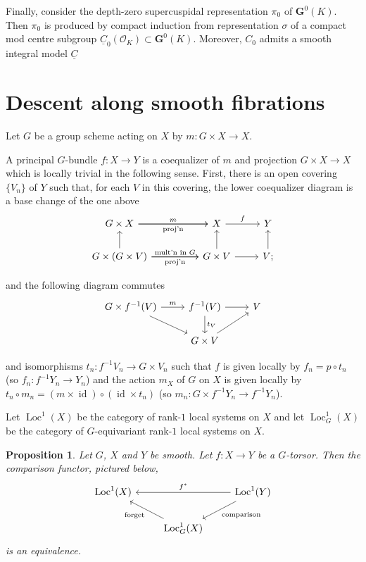 \documentclass[10pt]{amsart}
\theoremstyle{plain}
\newtheorem{proposition}[theorem]{Proposition}
\theoremstyle{definition}
\newcommand{\OK}{\mathcal{O}_K}
\newcommand{\G}{\textbf{G}}
\DeclareMathOperator{\id}{id}
\DeclareMathOperator{\Loc}{Loc}
\begin{document}
Finally, consider the depth-zero supercuspidal representation $\pi_0$ of $\G^0(K)$.
Then $\pi_0$ is produced by compact induction from representation $\sigma$ of a compact mod centre subgroup $\underline{C}_0(\OK) \subset \G^0(K)$. Moreover, $C_0$ admits a smooth integral model $\underline{C}$ 

\appendix

\section{Descent along smooth fibrations}

Let $G$ be a group scheme acting on $X$ by $m : G \times X \to X$.

A principal $G$-bundle $f : X\to Y$ is a coequalizer of $m$ and projection $G\times X \to X$  
which is locally trivial in the following sense.
First, there is an open covering $\{ V_n\}$ of $Y$ such that, for each $V$ in this covering, the lower coequalizer diagram is a base change of the one above
\[
\begin{tikzcd}
G\times X
 \arrow{rr}[shift left]{m}
  \arrow{rr}[shift right,swap]{\text{proj'n}}
&& X \arrow{r}{f} &  Y\\
G\times  (G\times V) \arrow{u}
 \arrow{rr}[shift left]{\text{mult'n in $G$}}
  \arrow{rr}[shift right,swap]{\text{proj'n}}
&& G\times V \arrow{u}  \arrow{r} &  \arrow{u} V;
\end{tikzcd}
\]

and the following diagram commutes
\[
\begin{tikzcd}
G\times  f^{-1}(V)
 \arrow{r}[shift left]{m}
  \arrow{dr} 
& f^{-1}(V) \arrow{r} \arrow{d}{t_V} &  V \\
& G\times V \arrow{ur} & 
\end{tikzcd}
\]


and isomorphisms ${t}_n : f^{-1}{V}_n \to {G}\times {V}_n$ such that  ${f}$ is given locally by ${f}_n = p \circ {t}_n$ (so ${f}_n : {f}^{-1}{Y}_n \to {Y}_n$) and the action ${m}_{X}$ of ${G}$ on ${X}$ is given locally by ${t}_n \circ {m}_n =  ({m} \times \id) \circ (\id\times{t}_n)$ (so ${m}_n : {G}\times{f}^{-1}{Y}_n \to {f}^{-1}{Y}_n$). 

Let $\Loc^1(X)$ be the category of rank-$1$ local systems on $X$ and let $\Loc_G^1(X)$ be the category of $G$-equivariant rank-$1$ local systems on $X$.

\begin{proposition}
Let $G$, $X$ and $Y$ be smooth.
Let $f : X \to Y$ be a $G$-torsor.
Then the comparison functor, pictured below,
\[
\begin{tikzcd}
\Loc^1(X) 
&&\arrow{ll}[swap]{f^*} 
\Loc^1(Y) \arrow{dl}{\text{comparison}}\\
& \arrow{ul}{\text{forget}} \Loc^1_G(X) & 
\end{tikzcd}
\]
is an equivalence.
\end{proposition}
\end{document}

